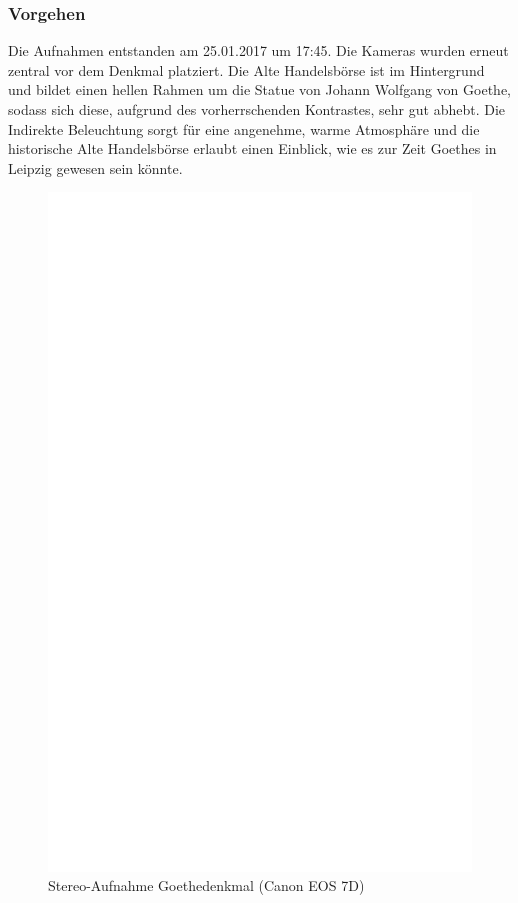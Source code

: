 \documentclass[liststotoc,bibtotoc,fontsize=14pt,]{scrreprt}
\begin{document}
	\subsubsection{Vorgehen}
	Die Aufnahmen entstanden am 25.01.2017 um 17:45. Die Kameras wurden erneut zentral vor dem Denkmal platziert. Die Alte Handelsbörse ist im Hintergrund und bildet einen hellen Rahmen um die Statue von Johann Wolfgang von Goethe, sodass sich diese, aufgrund des vorherrschenden Kontrastes, sehr gut abhebt. Die Indirekte Beleuchtung sorgt für eine angenehme, warme Atmosphäre und die historische Alte Handelsbörse erlaubt einen Einblick, wie es zur Zeit Goethes in Leipzig gewesen sein könnte. 

	 \newpage
	 \begin{figure}[h]
		 	\includegraphics[width=\linewidth]{img/ph.jpg}
		 	\caption{Stereo-Aufnahme Goethedenkmal (Canon EOS 7D)}
	 \end{figure}
	 
\end{document}
